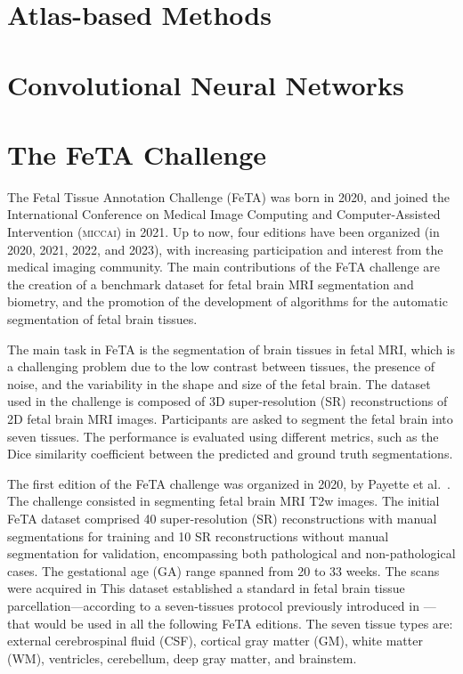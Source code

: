 \section{Atlas-based Methods}

\section{Convolutional Neural Networks}

\section{The FeTA Challenge}
The Fetal Tissue Annotation Challenge (FeTA) \cite{FeTA2024} was born in 2020, and joined the International Conference on Medical Image Computing and Computer-Assisted Intervention (\textsc{miccai}) \cite{MICCAI} in 2021. Up to now, four editions have been organized (in 2020, 2021, 2022, and 2023), with increasing participation and interest from the medical imaging community. The main contributions of the FeTA challenge are the creation of a benchmark dataset for fetal brain MRI segmentation and biometry, and the promotion of the development of algorithms for the automatic segmentation of fetal brain tissues.

The main task in FeTA is the segmentation of brain tissues in fetal MRI, which is a challenging problem due to the low contrast between tissues, the presence of noise, and the variability in the shape and size of the fetal brain. The dataset used in the challenge is composed of 3D super-resolution (SR) reconstructions of 2D fetal brain MRI images. Participants are asked to segment the fetal brain into seven tissues. The performance is evaluated using different metrics, such as the Dice similarity coefficient between the predicted and ground truth segmentations. \cite{FeTA2024_paper}

The first edition of the FeTA challenge was organized in 2020, by Payette et al.\ \cite{FeTA2020_review}. The challenge consisted in segmenting fetal brain MRI T2w images. The initial FeTA dataset comprised 40 super-resolution (SR) reconstructions with manual segmentations for training and 10 SR reconstructions without manual segmentation for validation, encompassing both pathological and non-pathological cases. The gestational age (GA) range spanned from 20 to 33 weeks. The scans were acquired in This dataset established a standard in fetal brain tissue parcellation---according to a seven-tissues protocol previously introduced in \cite{Payette2020}---that would be used in all the following FeTA editions. The seven tissue types are: external cerebrospinal fluid (CSF), cortical gray matter (GM), white matter (WM), ventricles, cerebellum, deep gray matter, and brainstem.

